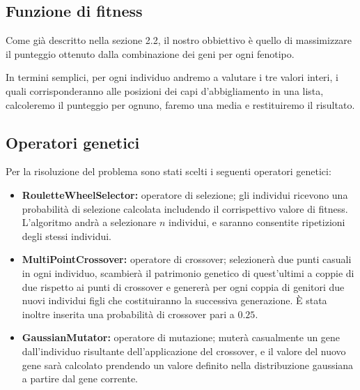 \documentclass[a4paper, 11pt, oneside]{report}
\begin{document}
                \subsection{Funzione di fitness}
                \par \noindent Come già descritto nella sezione 2.2, il
                nostro obbiettivo è quello di massimizzare il punteggio ottenuto dalla combinazione dei geni per ogni
                fenotipo.
                \par \noindent In termini semplici, per ogni individuo andremo a valutare i tre valori interi, i quali
                corrisponderanno alle posizioni dei capi d'abbigliamento in una lista, calcoleremo il punteggio per ognuno,
                faremo una media e restituiremo il risultato.

                \subsection{Operatori genetici}\label{subsec:op_gen}
                Per la risoluzione del problema sono stati scelti i seguenti operatori genetici:
                \begin{itemize}
                    \item \textbf{RouletteWheelSelector:} operatore di selezione; gli individui ricevono una probabilità
                    di selezione calcolata includendo il corrispettivo valore di fitness. L'algoritmo andrà a selezionare
                    $n$ individui, e saranno consentite ripetizioni degli stessi individui.
                    \item \textbf{MultiPointCrossover:} operatore di crossover; selezionerà due punti casuali in ogni
                    individuo, scambierà il patrimonio genetico di quest'ultimi a coppie di due rispetto ai punti di
                    crossover e genererà per ogni coppia di genitori due nuovi individui figli che costituiranno la
                    successiva generazione. È stata inoltre inserita una probabilità di crossover pari a $0.25$.
                    \item \textbf{GaussianMutator:} operatore di mutazione; muterà casualmente un gene dall'individuo
                    risultante dell'applicazione del crossover, e il valore del nuovo gene sarà calcolato prendendo un
                    valore definito nella distribuzione gaussiana a partire dal gene corrente.
                \end{itemize}
\end{document}
